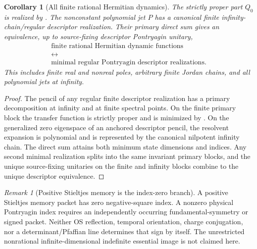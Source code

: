 \documentclass[11pt]{article}
\newtheorem{corollary}[corollary]{Corollary}
\theoremstyle{definition}
\theoremstyle{remark}
\newtheorem{remark}[remark]{Remark}
\theoremstyle{definition}
\theoremstyle{remark}
\begin{document}
\begin{corollary}[All finite rational Hermitian dynamics]
\label{cor:supp-all-rational}
The strictly proper part $Q_0$ is realized by
.  The nonconstant polynomial jet $P$ has a
canonical finite infinity-chain/regular descriptor realization.  Their primary
direct sum gives an equivalence, up to source-fixing descriptor Pontryagin unitary,
\begin{equation}
{
\begin{gathered}
\text{finite rational Hermitian dynamic functions}\\
\longleftrightarrow\\
\text{minimal regular Pontryagin descriptor realizations}.
\end{gathered}}
\label{eq:supp-all-rational-equivalence}
\end{equation}
This includes finite real and nonreal poles, arbitrary finite Jordan chains, and all
polynomial jets at infinity.
\end{corollary}

\begin{proof}
The pencil of any regular finite descriptor realization has a primary decomposition
at infinity and at finite spectral points.  On the finite primary block the transfer
function is strictly proper and is minimized by
.  On the generalized zero eigenspace of an
anchored descriptor pencil, the resolvent expansion is polynomial and is represented
by the canonical nilpotent infinity chain.  The direct sum attains both minimum
state dimensions and indices.  Any second minimal realization splits into the
same invariant primary blocks, and the unique source-fixing unitaries on the finite
and infinity blocks combine to the unique descriptor equivalence.
\end{proof}

\begin{remark}[Positive Stieltjes memory is the index-zero branch]
\label{scope:supp-positive-index-zero}
A positive Stieltjes memory packet has zero negative-square index.  A nonzero
physical Pontryagin index requires an independently occurring fundamental-symmetry
or signed packet.  Neither OS reflection, temporal orientation, charge conjugation,
nor a determinant/Pfaffian line determines that sign by itself.  The unrestricted
nonrational infinite-dimensional indefinite essential image is not claimed here.
\end{remark}
\end{document}

